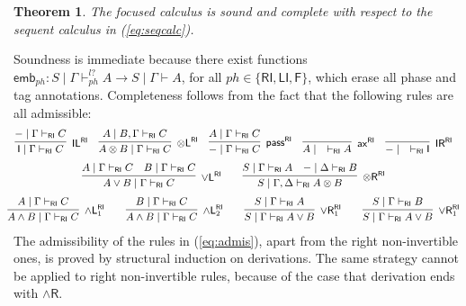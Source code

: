 \documentclass[submission,copyright,creativecommons]{eptcs}
\newtheorem{theorem}{Theorem}[section]
\theoremstyle{definition}
\newcommand{\tl}{\otimes \mathsf{L}}
\newcommand{\tr}{\otimes \mathsf{R}}
\newcommand{\pass}{\mathsf{pass}}
\newcommand{\unitl}{\mathsf{IL}}
\newcommand{\unitr}{\mathsf{IR}}
\newcommand{\andlone}{\land \mathsf{L}_{1}}
\newcommand{\andltwo}{\land \mathsf{L}_{2}}
\newcommand{\andr}{\land \mathsf{R}}
\newcommand{\orl}{\lor \mathsf{L}}
\newcommand{\orrone}{\lor \mathsf{R}_{1}}
\newcommand{\ax}{\mathsf{ax}}
\newcommand{\ot}{\otimes}
\newcommand{\I}{\mathsf{I}}
\newcommand{\RI}{\mathsf{RI}}
\newcommand{\LI}{\mathsf{LI}}
\newcommand{\F}{\mathsf{F}}
\begin{document}
\begin{theorem}\label{theorem:focus:sound:complete}
  The focused calculus is sound and complete with respect to the sequent calculus in (\ref{eq:seqcalc}).
\end{theorem}
Soundness is immediate because there exist functions $\mathsf{emb}_{ph} : S \mid \Gamma \vdash^{l?}_{ph} A \to S \mid \Gamma \vdash A$, for all $ph \in \{ \RI , \LI , \F \}$, which erase all phase and tag annotations.
Completeness follows from the fact that the following rules are all admissible:
\begin{equation}\label{eq:admis}
  \small
  \hspace*{-4mm}
    \begin{array}{c}
      \infer[\unitl^{\RI}]{\I \mid \Gamma \vdash_{\RI} C}{{-} \mid \Gamma \vdash_{\RI} C}
      \quad
      \infer[\tl^{\RI}]{A \ot B \mid \Gamma \vdash_{\RI} C}{A \mid B, \Gamma \vdash_{\RI} C}
      \quad
      \infer[\pass^{\RI}]{{-} \mid \Gamma \vdash_{\RI} C}{A \mid \Gamma \vdash_{\RI} C}
      \quad
      \infer[\ax^{\RI}]{A \mid \quad \vdash_{\RI} A}{}
      \quad
      \infer[\unitr^{\RI}]{{-} \mid \quad \vdash_{\RI} \I}{}
  \\[6pt]
      \infer[\orl^{\RI}]{A \lor B \mid \Gamma \vdash_{\RI} C}{
      A \mid \Gamma \vdash_{\RI} C
      &
      B \mid \Gamma \vdash_{\RI} C
      }
      \qquad
      \infer[\tr^{\RI}]{S \mid \Gamma , \Delta \vdash_{\RI} A \ot B}{
        S \mid \Gamma \vdash_{\RI} A
        &
        {-} \mid \Delta \vdash_{\RI} B
      }
  \\[6pt]
      \infer[\andlone^{\RI}]{A \land B \mid \Gamma \vdash_{\RI} C}{A \mid \Gamma \vdash_{\RI} C}
      \qquad
      \infer[\andltwo^{\RI}]{A \land B \mid \Gamma \vdash_{\RI} C}{B \mid \Gamma \vdash_{\RI} C}
      \qquad
      \infer[\orrone^{\RI}]{S \mid \Gamma \vdash_{\RI} A \lor B}{S \mid \Gamma \vdash_{\RI} A}
      \qquad
      \infer[\orrone^{\RI}]{S \mid \Gamma \vdash_{\RI} A \lor B}{S \mid \Gamma \vdash_{\RI} B}
    \end{array}
  \end{equation}
The admissibility of the rules in (\ref{eq:admis}), apart from the right non-invertible ones, is proved by structural induction on derivations.
The same strategy cannot be applied to right non-invertible rules, because of the case that derivation ends with $\andr$.
\end{document}
